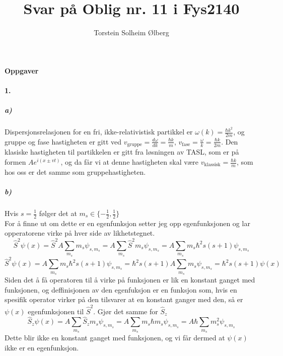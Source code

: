 \documentclass[11pt, A4paper,norsk]{article}
\author{Torstein Solheim Ølberg}
\title{Svar på Oblig nr. 11 i Fys2140}
\begin{document}
\maketitle
	\begin{center}
\Large \textbf{Oppgaver}
	\end{center}









		\paragraph{1.}
			\subparagraph{a)}
				\begin{flushleft}
Dispersjonsrelasjonen for en fri, ikke-relativistisk partikkel er $\omega(k) = \frac{\hbar k^2}{2m}$, og gruppe og fase hastigheten er gitt ved $v_{\text{gruppe}} = \frac{d \omega}{dk} = \frac{\hbar k}{m}$, $v_{\text{fase}} = \frac{\omega}{k} = \frac{\hbar k}{2m}$. Den klasiske hastigheten til partikkelen er gitt fra løsningen av TASL, som er på formen $A e^{i(x \pm vt)}$, og da får vi at denne hastigheten skal være $v_{\text{klassisk}} = \frac{\hbar k}{m}$, som hos oss er det samme som gruppehastigheten.
				\end{flushleft}









			\subparagraph{b)}
				\begin{flushleft}
Hvis $s = \frac{1}{2}$ følger det at $m_s \in \{- \frac{1}{2}, \frac{1}{2}\}$ \\
For å finne ut om dette er en egenfunksjon setter jeg opp egenfunksjonen og lar opperatorene virke på hver side av likhetstegnet.
$$\hat{S}^2 \psi(x) = \hat{S}^2 A \sum_{m_s} m_s \psi_{s, m_s} = A \sum_{m_s} \hat{S}^2 m_s \psi_{s, m_s} = A \sum_{m_s} m_s \hbar^2 s(s + 1) \psi_{s, m_s}$$
$$\hat{S}^2 \psi(x) = A \sum_{m_s} m_s \hbar^2 s(s + 1) \psi_{s, m_s} = \hbar^2 s(s + 1) A \sum_{m_s} m_s \psi_{s, m_s} = \hbar^2 s(s + 1) \psi(x)$$
Siden det å få operatoren til å virke på funksjonen er lik en konstant ganget med funksjonen, og deffinisjonen av den egenfuksjon er en funksjon som, hvis en spesifik operator virker på den tilsvarer at en konstant ganger med den, så er $\psi(x)$ egenfunksjonen til $\hat{S}^2$.
Gjør det samme for $\hat{S}_z$
$$\hat{S}_z \psi(x) = A \sum_{m_s} \hat{S}_z m_s \psi_{s, m_s} = A \sum_{m_s} m_s \hbar m_s \psi_{s, m_s} = A \hbar \sum_{m_s} m_s^2 \psi_{s, m_s}$$
Dette blir ikke en konstant ganget med funksjonen, og vi får dermed at $\psi(x)$ ikke er en egenfunksjon.
				\end{flushleft}
\end{document}
